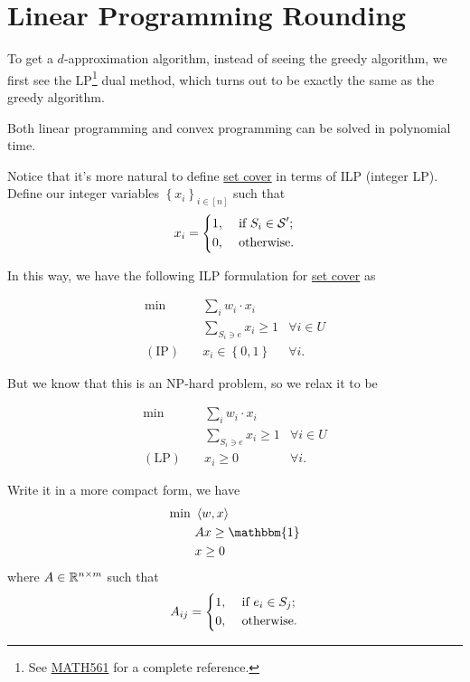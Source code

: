 
\section{Linear Programming Rounding}

To get a \(d\)-approximation algorithm, instead of seeing the greedy algorithm, we first see the LP\footnote{See \href{https://www.pbb.wtf/posts/Notes\#linear-programming-math561ioe510to518-umich}{MATH561} for a complete reference.} dual method, which turns out to be exactly the same as the greedy algorithm.

\begin{prev}
	Both linear programming and convex programming can be solved in polynomial time.
\end{prev}

Notice that it's more natural to define \hyperref[prb:set-cover]{set cover} in terms of ILP (integer LP). Define our integer variables \(\left\{ x_i \right\} _{i\in [n]}\) such that
\[
	x_i = \begin{dcases}
		1, & \text{ if } S_i\in \mathcal{\MakeUppercase{S}} ^\prime  ; \\
		0, & \text{ otherwise}.
	\end{dcases}
\]

In this way, we have the following ILP formulation for \hyperref[prb:set-cover]{set cover} as

\begin{align*}
	\min~            & \sum_{i} w_i \cdot x_i                           \\
	                 & \sum_{S_i\ni e}x_{i} \geq 1     & \forall i\in U \\
	(\text{IP})\quad & x_{i} \in \left\{ 0, 1 \right\} & \forall i.
\end{align*}

But we know that this is an NP-hard problem, so we relax it to be

\begin{align*}
	\min~            & \sum_{i} w_i \cdot x_i                       \\
	                 & \sum_{S_i\ni e}x_{i} \geq 1 & \forall i\in U \\
	(\text{LP})\quad & x_{i} \geq 0                & \forall i.
\end{align*}

Write it in a more compact form, we have
\begin{align*}
	\min~ & \left\langle w, x \right\rangle \\
	      & Ax \geq \mathbbm{1}             \\
	      & x\geq 0
\end{align*}
where \(A\in \mathbb{\MakeUppercase{r}} ^{n\times m}\) such that
\[
	A_{ij} = \begin{dcases}
		1, & \text{ if } e_i\in S_j ; \\
		0, & \text{ otherwise}.
	\end{dcases}
\]

